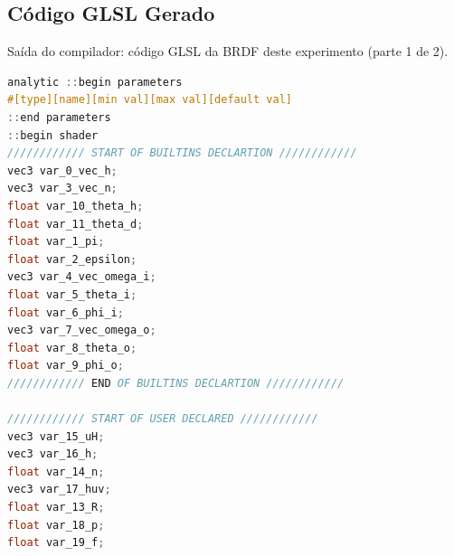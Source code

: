 \subsection{Código GLSL Gerado}
\begin{codigo}[H]
    \caption{\small Saída do compilador: código GLSL da BRDF deste experimento (parte 1 de 2).}
    \label{cod-edwards-2006-glsl-pt-1}
\begin{lstlisting}[language=C, inputencoding=utf8]
analytic ::begin parameters
#[type][name][min val][max val][default val]
::end parameters
::begin shader
//////////// START OF BUILTINS DECLARTION ////////////
vec3 var_0_vec_h;
vec3 var_3_vec_n;
float var_10_theta_h;
float var_11_theta_d;
float var_1_pi;
float var_2_epsilon;
vec3 var_4_vec_omega_i;
float var_5_theta_i;
float var_6_phi_i;
vec3 var_7_vec_omega_o;
float var_8_theta_o;
float var_9_phi_o;
//////////// END OF BUILTINS DECLARTION ////////////

//////////// START OF USER DECLARED ////////////
vec3 var_15_uH;
vec3 var_16_h;
float var_14_n;
vec3 var_17_huv;
float var_13_R;
float var_18_p;
float var_19_f;
\end{lstlisting}
\end{codigo}


